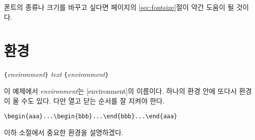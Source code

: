 폰트의 종류나 크기를 바꾸고 싶다면 \pageref{sec:fontsize}페이지의 \ref{sec:fontsize}절이
약간 도움이 될 것이다.

\section{환경} \label{env}

\begin{lscommand}
\verb|{|\emph{environment}\verb|}|\quad
   \emph{text}\quad
{}\verb|{|\emph{environment}\verb|}|
\end{lscommand}
\noindent 이 예제에서 \emph{environment}는 [environment]의 이름이다.
하나의 환경 안에 또다시 환경이 올 수도 있다. 다만 열고 닫는 순서를 잘 지켜야 한다.
\begin{code}
\verb|\begin{aaa}...\begin{bbb}...\end{bbb}...\end{aaa}|
\end{code}

\noindent 이하 소절에서 중요한 환경을 설명하겠다.

